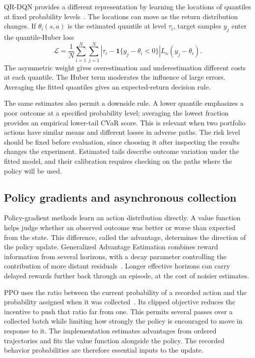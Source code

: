 \documentclass{strategynet-journal}
\begin{document}
QR-DQN provides a different representation by learning the locations of
quantiles at fixed probability levels~\cite{qrdqn}. The locations can move
as the return distribution changes. If $\theta_i(s,a)$ is the estimated
quantile at level $\tau_i$, target samples $y_j$ enter the quantile-Huber loss
\[
  \mathcal L=
  \frac{1}{N}\sum_{i=1}^{N}\sum_{j=1}^{N}
  \left|\tau_i-\mathbf 1\{y_j-\theta_i<0\}\right|
  L_\kappa(y_j-\theta_i).
\]
The asymmetric weight gives overestimation and underestimation different
costs at each quantile. The Huber term moderates the influence of large errors.
Averaging the fitted quantiles gives an expected-return decision rule.

The same estimates also permit a downside rule. A lower quantile emphasizes
a poor outcome at a specified probability level; averaging the lowest fraction
provides an empirical lower-tail CVaR score. This is relevant when two portfolio
actions have similar means and different losses in adverse paths. The risk
level should be fixed before evaluation, since choosing it after inspecting
the results changes the experiment. Estimated tails describe outcome variation
under the fitted model, and their calibration requires checking on the paths
where the policy will be used.

\subsection{Policy gradients and asynchronous collection}

Policy-gradient methods learn an action distribution directly. A value function
helps judge whether an observed outcome was better or worse than expected from
the state. This difference, called the advantage, determines the direction of
the policy update. Generalized Advantage Estimation combines reward information
from several horizons, with a decay parameter controlling the contribution of
more distant residuals~\cite{gae}. Longer effective horizons can carry delayed
rewards further back through an episode, at the cost of noisier estimates.

PPO uses the ratio between the current probability of a recorded action and
the probability assigned when it was collected~\cite{ppo}. Its clipped
objective reduces the incentive to push that ratio far from one. This permits
several passes over a collected batch while limiting how strongly the policy
is encouraged to move in response to it. The implementation estimates
advantages from ordered trajectories and fits the value function alongside
the policy. The recorded behavior probabilities are therefore essential inputs
to the update.
\end{document}
